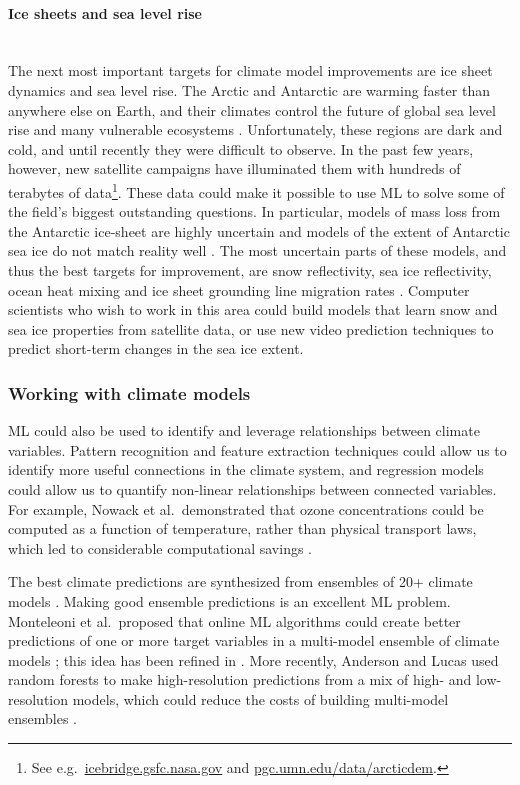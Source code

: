 \documentclass[11pt]{report}
\newcommand{\Gap}{\texorpdfstring{\hfill}{}}
\newcommand{\Rec}{\texorpdfstring{{\small\emph{\color{blue}{\fbox{High Leverage}}}}}{}}
\begin{document}
\paragraph{Ice sheets and sea level rise}\Gap\textbf{\Rec}\mbox{}\\
The next most important targets for climate model improvements are ice sheet dynamics and sea level rise. The Arctic and Antarctic are warming faster than anywhere else on Earth, and their climates control the future of global sea level rise and many vulnerable ecosystems \cite{ipcc2014summary, ipcc_global_2018}. Unfortunately, these regions are dark and cold, and until recently they were difficult to observe. In the past few years, however, new satellite campaigns have illuminated them with hundreds of terabytes of data\footnote{See e.g.~\url{icebridge.gsfc.nasa.gov} and \url{pgc.umn.edu/data/arcticdem}.}. These data could make it possible to use ML to solve some of the field's biggest outstanding questions. In particular, models of mass loss from the Antarctic ice-sheet are highly uncertain \cite{Kopp2017} and models of the extent of Antarctic sea ice do not match reality well \cite{Gagne2015}. The most uncertain parts of these models, and thus the best targets for improvement, are snow reflectivity, sea ice reflectivity, ocean heat mixing and ice sheet grounding line migration rates \cite{Hourdin2017,Kopp2017,Hanna2013}. Computer scientists who wish to work in this area could build models that learn snow and sea ice properties from satellite data, or use new video prediction techniques to predict short-term changes in the sea ice extent.

\subsubsection{Working with climate models}
ML could also be used to identify and leverage relationships between climate variables. Pattern recognition and feature extraction techniques could allow us to identify more useful connections in the climate system, and regression models could allow us to quantify non-linear relationships between connected variables. For example, Nowack et al.~demonstrated that ozone concentrations could be computed as a function of temperature, rather than physical transport laws, which led to considerable computational savings \cite{Nowack2018}.

The best climate predictions are synthesized from ensembles of 20+ climate models \cite{Tebaldi2007}. Making good ensemble predictions is an excellent ML problem. Monteleoni et al.~proposed that online ML algorithms could create better predictions of one or more target variables in a multi-model ensemble of climate models \cite{Monteleoni2011}; this idea has been refined in \cite{Mcquade2012,Strobach2015}. More recently, Anderson and Lucas used random forests to make high-resolution predictions from a mix of high- and low-resolution models, which could reduce the costs of building multi-model ensembles \cite{Anderson2018}. 
 
\end{document}
